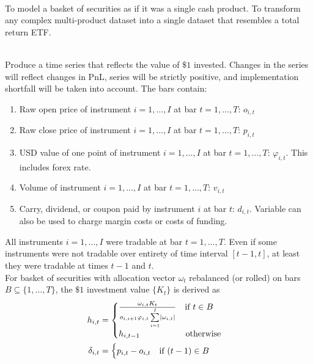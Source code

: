 \documentclass[a4paper,oneside,openany]{book}
\begin{document}
\begin{definition} \\
To model a basket of securities as if it was a single cash product. To transform any complex multi-product dataset into a single dataset that resembles a total return ETF.
\end{definition}

\begin{method} \\
Produce a time series that reflects the value of $\$1$ invested. Changes in the series will reflect changes in PnL, series will be strictly positive, and implementation shortfall will be taken into account. The bars contain:
\begin{enumerate}[label=\roman*.]
\setlength{\itemsep}{0pt}
\item Raw open price of instrument $i = 1, \ldots, I$ at bar $t = 1, \ldots, T$: $o_{i,t}$
\item Raw close price of instrument $i = 1, \ldots, I$ at bar $t = 1, \ldots, T$: $p_{i,t}$
\item USD value of one point of instrument $i = 1, \ldots, I$ at bar $t = 1, \ldots, T$: $\varphi_{i,t}$. This includes forex rate.
\item Volume of instrument $i = 1, \ldots, I$ at bar $t = 1, \ldots, T$: $v_{i,t}$
\item Carry, dividend, or coupon paid by instrument $i$ at bar $t$: $d_{i,t}$. Variable can also be used to charge margin costs or costs of funding.
\end{enumerate}
All instruments $i = 1, \ldots, I$ were tradable at bar $t = 1, \ldots, T$. Even if some instruments were not tradable over entirety of time interval $[t-1, t]$, at least they were tradable at times $t-1$ and $t$.\\
For basket of securities with allocation vector $\omega_t$ rebalanced (or rolled) on bars $B \subseteq \{1, \ldots, T \}$, the $\$1$ investment value $\{K_t\}$ is derived as 
\begin{align}
h_{i,t} &= 
\begin{cases}
\frac{\omega_{i,t} K_t}{o_{i, i+1} \varphi_{i,t} \sum\limits_{i=1}^I \left\lvert\omega_{i,t}\right\rvert} \ \ \ \text{if } t \in B \\
h_{i, t - 1} \ \ \ \ \ \ \ \ \ \ \ \ \ \ \ \ \text{otherwise}
\end{cases} \nonumber \\
\delta_{i,t} &=
\begin{cases}
p_{i,t} - o_{i,t} \ \ \ \text{if } (t-1) \in B \\

\end{cases}
\end{align}
\end{method}
\end{document}
